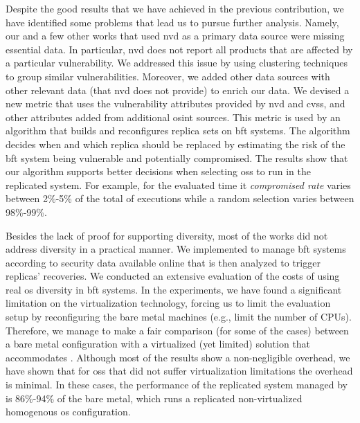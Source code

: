 Despite the good results that we have achieved in the previous contribution, we have identified some problems that lead us to pursue further analysis.
Namely, our and a few other works that used \gls{nvd} as a primary data source were missing essential data. 
In particular, \gls{nvd} does not report all products that are affected by a particular vulnerability.
We addressed this issue by using clustering techniques to group similar vulnerabilities.
Moreover, we added other data sources with other relevant data (that \gls{nvd} does not provide) to enrich our data.
We devised a new metric that uses the vulnerability attributes provided by \gls{nvd} and \gls{cvss}, and other attributes added from additional \gls{osint} sources. 
This metric is used by an algorithm that builds and reconfigures replica sets on \gls{bft} systems.
The algorithm decides when and which replica should be replaced by estimating the risk of the \gls{bft} system being vulnerable and potentially compromised.
The results show that our algorithm supports better decisions when selecting \glspl{os} to run in the replicated system. 
For example, for the evaluated time it \emph{compromised rate} varies between 2\%-5\% of the total of executions while a random selection varies between 98\%-99\%.
 

Besides the lack of proof for supporting diversity, most of the works did not address diversity in a practical manner.
We implemented \system to manage \gls{bft} systems according to security data available online that is then analyzed to trigger replicas' recoveries.
We conducted an extensive evaluation of the costs of using real \gls{os} diversity in \gls{bft} systems.
In the experiments, we have found a significant limitation on the virtualization technology, forcing us to limit the evaluation setup by reconfiguring the bare metal machines (e.g., limit the number of CPUs).
Therefore, we manage to make a fair comparison (for some of the cases) between a bare metal configuration with a virtualized (yet limited) solution that accommodates \system.
Although most of the results show a non-negligible overhead, we have shown that for \glspl{os} that did not suffer virtualization limitations the overhead is minimal.
In these cases, the performance of the replicated system managed by \system is 86\%-94\% of the bare metal, which runs a replicated non-virtualized homogenous \gls{os} configuration.

